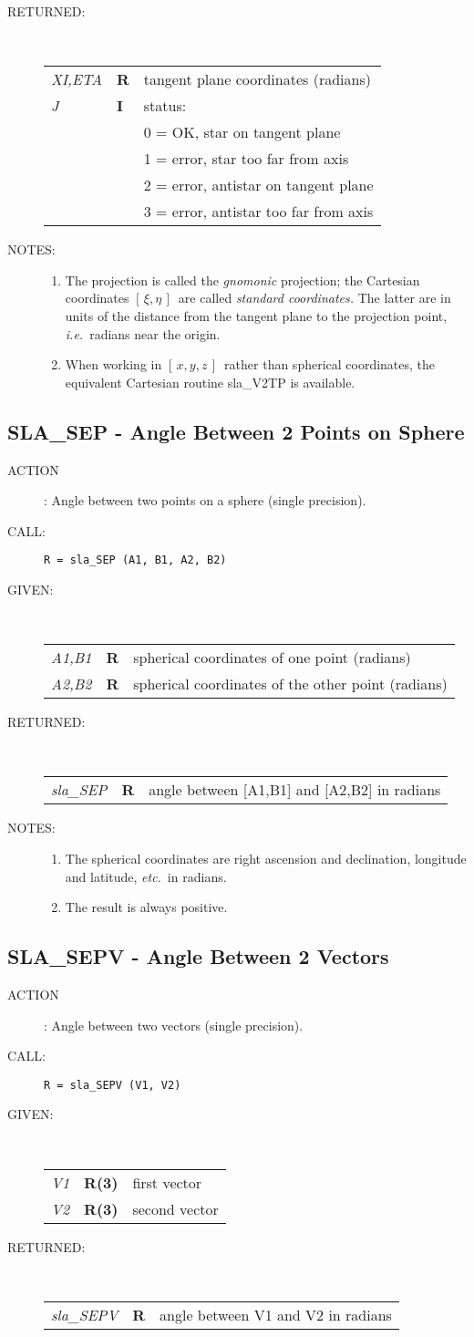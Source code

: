 \documentclass[11pt,twoside]{article}
\newcommand{\xlabel}[1]{}
\newcommand{\xieta}     {$[\,\xi,\eta\,]$}
\newcommand{\xyz}       {$[\,x,y,z\,]$}
\newcommand{\routine}[3]
{\hbadness=10000
  \vbox
  {
    \rule{\textwidth}{0.3mm}\\
    {\Large {\bf #1} \hfill #2 \hfill {\bf #1}}\\
    \setlength{\oldspacing}{\topsep}
    \setlength{\topsep}{0.3ex}
    \begin{description}
      #3
    \end{description}
    \setlength{\topsep}{\oldspacing}
  }
}
\renewcommand{\routine}[3]
   {
      \subsection{#1\xlabel{#1} - #2\label{#1}}
       \begin{description}
         #3
       \end{description}
   }
\newcommand{\action}[1]
{\item[ACTION]: #1}
\newcommand{\action}[1]
   {\item[ACTION:] #1}
\newcommand{\call}[1]
{\item[CALL]: \hspace{0.4em}{\tt #1}}
\newlength{\oldspacing}
\renewcommand{\call}[1]
   {
    \item[CALL:] {\tt #1}
   }
\newcommand{\args}[2]
{
  \goodbreak
  \setlength{\oldspacing}{\topsep}
  \setlength{\topsep}{0.3ex}
  \begin{description}
  \item[#1]:\\[1.5ex]
    \begin{tabular}{p{7em}p{6em}p{22em}}
      #2
    \end{tabular}
  \end{description}
  \setlength{\topsep}{\oldspacing}
}
\renewcommand{\args}[2]
   {
     \begin{description}
        \item[#1:]\\
        \begin{tabular}{p{7em}p{6em}l}
           #2
        \end{tabular}
     \end{description}
   }
\newcommand{\spec}[3]
{
  {\em {#1}} & {\bf \mbox{#2}} & {#3}
}
\newcommand{\notes}[1]
{
  \goodbreak
  \setlength{\oldspacing}{\topsep}
  \setlength{\topsep}{0.3ex}
  \begin{description}
    \item[NOTES]:
        #1
  \end{description}
  \setlength{\topsep}{\oldspacing}
}
\renewcommand{\notes}[1]
   {
      \begin{description}
         \item[NOTES:]
            #1
      \end{description}
   }
\begin{document}
\args{RETURNED}
{
 \spec{XI,ETA}{R}{tangent plane coordinates (radians)} \\
 \spec{J}{I}{status:} \\
 \spec{}{}{\hspace{1.5em} 0 = OK, star on tangent plane} \\
 \spec{}{}{\hspace{1.5em} 1 = error, star too far from axis} \\
 \spec{}{}{\hspace{1.5em} 2 = error, antistar on tangent plane} \\
 \spec{}{}{\hspace{1.5em} 3 = error, antistar too far from axis}
}
\notes
{
 \begin{enumerate}
  \item The projection is called the {\it gnomonic}\/ projection;  the
        Cartesian coordinates \xieta\ are called
        {\it standard coordinates.}\/  The latter
        are in units of the distance from the tangent plane to the projection
        point, {\it i.e.}\ radians near the origin.
  \item When working in \xyz\ rather than spherical coordinates, the
        equivalent Cartesian routine sla\_V2TP is available.
 \end{enumerate}
}
\routine{SLA\_SEP}{Angle Between 2 Points on Sphere}
{
 \action{Angle between two points on a sphere (single precision).}
 \call{R~=~sla\_SEP (A1, B1, A2, B2)}
}
\args{GIVEN}
{
 \spec{A1,B1}{R}{spherical coordinates of one point (radians)} \\
 \spec{A2,B2}{R}{spherical coordinates of the other point (radians)}
}
\args{RETURNED}
{
 \spec{sla\_SEP}{R}{angle between [A1,B1] and [A2,B2] in radians}
}
\notes
{
 \begin{enumerate}
  \item The spherical coordinates are right ascension and declination,
  longitude and latitude, {\it etc.}\ in radians.
  \item The result is always positive.
 \end{enumerate}
}
\routine{SLA\_SEPV}{Angle Between 2 Vectors}
{
 \action{Angle between two vectors (single precision).}
 \call{R~=~sla\_SEPV (V1, V2)}
}
\args{GIVEN}
{
 \spec{V1}{R(3)}{first vector} \\
 \spec{V2}{R(3)}{second vector}
}
\args{RETURNED}
{
 \spec{sla\_SEPV}{R}{angle between V1 and V2 in radians}
}
\end{document}
